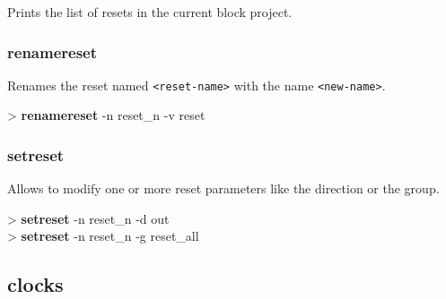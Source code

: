 \documentclass[10pt,a4paper]{article}
\begin{document}
Prints the list of resets in the current block project.

\subsubsection{renamereset}
\label{subsec:renamereset}

Renames the reset named \texttt{<reset-name>} with the name \texttt{<new-name>}.\\


\begin{sampletitle}
> \textbf{\tool{} renamereset} -n reset\_n -v reset
\end{sampletitle}


\subsubsection{setreset}
\label{subsec:setreset}

Allows to modify one or more reset parameters like the direction or the group.\\


\begin{sampletitle}
> \textbf{\tool{} setreset} -n reset\_n -d out \\
> \textbf{\tool{} setreset} -n reset\_n -g reset\_all
\end{sampletitle}

\subsection{clocks}
\end{document}
